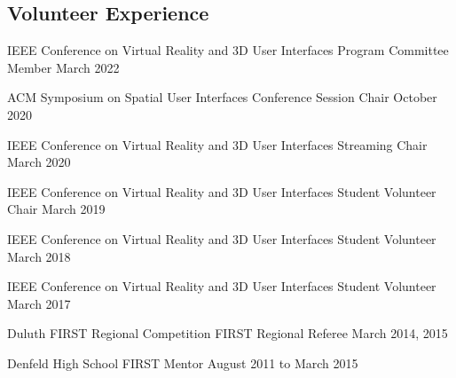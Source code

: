 
\begin{cventries}
  \vspace{-.75cm}    
  \subsection*{Volunteer Experience}
  
  \cventry
    {IEEE Conference on Virtual Reality and 3D User Interfaces} %
    {Program Committee Member} %
    {March 2022} %
    {} %
    {}
    \vspace{-0.15in}
    
  \cventry
    {ACM Symposium on Spatial User Interfaces} %
    {Conference Session Chair} %
    {October 2020} %
    {} %
    {}
    \vspace{-0.15in}

  \cventry
    {IEEE Conference on Virtual Reality and 3D User Interfaces} %
    {Streaming Chair} %
    {March 2020} %
    {} %
    {}
    \vspace{-0.15in}

  \cventry
    {IEEE Conference on Virtual Reality and 3D User Interfaces} %
    {Student Volunteer Chair} %
    {March 2019} %
    {} %
    {}
    \vspace{-0.15in}
    
  \cventry
    {IEEE Conference on Virtual Reality and 3D User Interfaces} %
    {Student Volunteer} %
    {March 2018} %
    {} %
    {}
    \vspace{-0.15in}
    
  \cventry
    {IEEE Conference on Virtual Reality and 3D User Interfaces} %
    {Student Volunteer} %
    {March 2017} %
    {} %
    {}
    \vspace{-0.15in}
    
  \cventry
    {Duluth FIRST Regional Competition} %
    {FIRST Regional Referee} %
    {March 2014, 2015} %
    {} %
    {}
    \vspace{-0.15in}
    
  \cventry
    {Denfeld High School} %
    {FIRST Mentor} %
    {August 2011 to March 2015} %
    {} %
    {}
    \vspace{-0.15in}
    

\end{cventries}
